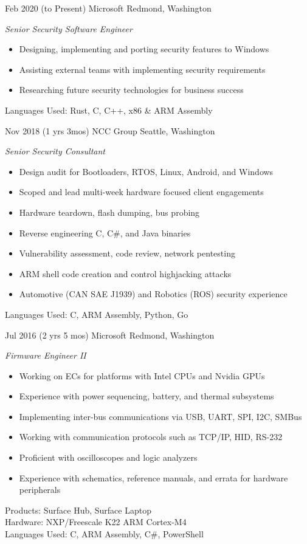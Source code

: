 \documentclass[print]{friggeri-cv} %
\begin{document}
\begin{entrylist}

\entry
{Feb 2020}
{(to Present)}
{Microsoft}
{Redmond, Washington}
{\emph{Senior Security Software Engineer}
\begin{itemize}
\item Designing, implementing and porting security features to Windows
\item Assisting external teams with implementing security requirements
\item Researching future security technologies for business success
\end{itemize}
Languages Used: Rust, C, C++, x86 \& ARM Assembly \\
}

\entry
{Nov 2018}
{(1 yrs 3mos)}
{NCC Group}
{Seattle, Washington}
{\emph{Senior Security Consultant}
\begin{itemize}
\item Design audit for Bootloaders, RTOS, Linux, Android, and Windows
\item Scoped and lead multi-week hardware focused client engagements
\item Hardware teardown, flash dumping, bus probing
\item Reverse engineering C, C\#, and Java binaries
\item Vulnerability assessment, code review, network pentesting
\item ARM shell code creation and control highjacking attacks
\item Automotive (CAN SAE J1939) and Robotics (ROS) security experience
\end{itemize}
Languages Used: C, ARM Assembly, Python, Go \\
}

\entry
{Jul 2016}
{(2 yrs 5 mos)}
{Microsoft}
{Redmond, Washington}
{\emph{Firmware Engineer II}
\begin{itemize}
\item Working on ECs for platforms with Intel CPUs and Nvidia GPUs
\item Experience with power sequencing, battery, and thermal subsystems
\item Implementing inter-bus communications via USB, UART, SPI, I2C, SMBus
\item Working with communication protocols such as TCP/IP, HID, RS-232
\item Proficient with oscilloscopes and logic analyzers
\item Experience with schematics, reference manuals, and errata for hardware peripherals
\end{itemize}
Products: Surface Hub, Surface Laptop \\
Hardware: NXP/Freescale K22 ARM Cortex-M4 \\
Languages Used: C, ARM Assembly, C\#, PowerShell \\
}


\end{entrylist}
\end{document}
